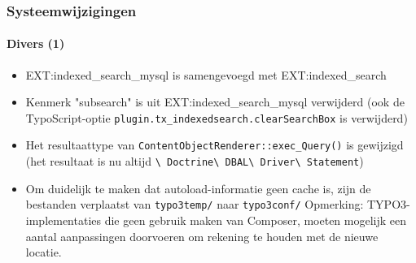 
\begin{frame}[fragile]
	\frametitle{Systeemwijzigingen}
	\framesubtitle{Divers (1)}

	\begin{itemize}

		\item EXT:indexed\_search\_mysql is samengevoegd met EXT:indexed\_search

		\item Kenmerk "subsearch" is uit EXT:indexed\_search\_mysql verwijderd\newline
			\smaller
				(ook de TypoScript-optie \texttt{plugin.tx\_indexedsearch.clearSearchBox} is verwijderd)
			\normalsize

		\item Het resultaattype van \texttt{ContentObjectRenderer::exec\_Query()} is gewijzigd\newline
			\smaller
				(het resultaat is nu altijd
					\texttt{\textbackslash
						Doctrine\textbackslash
						DBAL\textbackslash
						Driver\textbackslash
						Statement})
			\normalsize

		\item Om duidelijk te maken dat autoload-informatie geen cache is, 
			zijn de bestanden verplaatst van \texttt{typo3temp/} naar \texttt{typo3conf/}\newline
			\smaller
				Opmerking: TYPO3-implementaties die geen gebruik maken van Composer, 
					moeten mogelijk een aantal aanpassingen doorvoeren om rekening te houden met de nieuwe locatie.
			\normalsize

	\end{itemize}

\end{frame}

